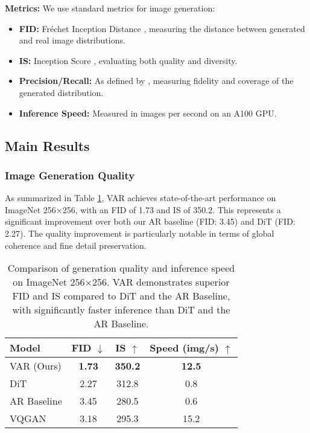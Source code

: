 \documentclass{article}
\begin{document}
\textbf{Metrics:} We use standard metrics for image generation:
\begin{itemize}[leftmargin=*,itemsep=2pt,topsep=3pt]
    \item \textbf{FID:} Fréchet Inception Distance \cite{heusel2017gans}, measuring the distance between generated and real image distributions.
    \item \textbf{IS:} Inception Score \cite{salimans2016improved}, evaluating both quality and diversity.
    \item \textbf{Precision/Recall:} As defined by \cite{kynkaanniemi2019improved}, measuring fidelity and coverage of the generated distribution.
    \item \textbf{Inference Speed:} Measured in images per second on an A100 GPU.
\end{itemize}

\subsection{Main Results}
\label{ssec:main_results}

\subsubsection{Image Generation Quality}
As summarized in Table \ref{tab:main_results}, VAR achieves state-of-the-art performance on ImageNet 256$\times$256, with an FID of 1.73 and IS of 350.2. This represents a significant improvement over both our AR baseline (FID: 3.45) and DiT (FID: 2.27). The quality improvement is particularly notable in terms of global coherence and fine detail preservation.

\begin{table}[htbp]
\centering
\caption{Comparison of generation quality and inference speed on ImageNet 256$\times$256. VAR demonstrates superior FID and IS compared to DiT and the AR Baseline, with significantly faster inference than DiT and the AR Baseline.}
\label{tab:main_results}
\begin{tabular}{lccc}
\toprule
Model & FID $\downarrow$ & IS $\uparrow$ & Speed (img/s) $\uparrow$ \\
\midrule
VAR (Ours)    & \textbf{1.73} & \textbf{350.2} & \textbf{12.5} \\
DiT           & 2.27          & 312.8          & 0.8 \\ %
AR Baseline   & 3.45          & 280.5          & 0.6 \\ %
VQGAN         & 3.18          & 295.3          & 15.2 \\ %
\bottomrule
\end{tabular}
\end{table}
\end{document}

